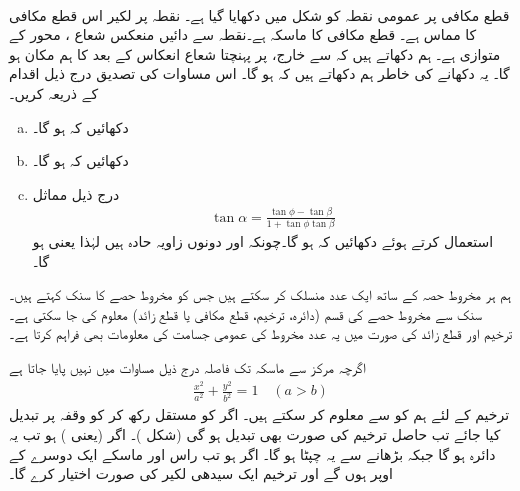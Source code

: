 \\
قطع مکافی  پر عمومی نقطہ  کو شکل  میں دکھایا گیا ہے۔ نقطہ  پر لکیر  اس قطع مکافی کا مماس ہے۔ قطع مکافی کا ماسکہ  ہے۔نقطہ  سے دائیں منعکس شعاع ، محور  کے متوازی  ہے۔ ہم دکھاتے ہیں کہ  سے خارج،  پر پہنچتا شعاع انعکاس کے بعد  کا ہم مکان ہو گا۔ یہ دکھانے کی خاطر ہم دکھاتے ہیں کہ  ہو گا۔ اس مساوات کی تصدیق درج ذیل اقدام کے ذریعہ کریں۔
\begin{enumerate}[a.]
\item
دکھائیں کہ  ہو گا۔
\item
دکھائیں کہ  ہو گا۔
\item
درج ذیل مماثل
\begin{align*}
\tan \alpha=\frac{\tan \phi-\tan\beta}{1+\tan\phi\tan\beta}
\end{align*}
استعمال کرتے ہوئے دکھائیں کہ  ہو گا۔چونکہ  اور  دونوں زاویہ حادہ ہیں لہٰذا
  یعنی  ہو گا۔ 
\end{enumerate}  

ہم ہر مخروط حصہ کے ساتھ ایک عدد منسلک کر سکتے ہیں جس کو مخروط حصے کا سنک کہتے ہیں۔ سنک سے مخروط حصے کی قسم (دائرہ، ترخیم، قطع مکافی یا قطع زائد) معلوم کی جا سکتی ہے۔ ترخیم اور قطع زائد کی صورت میں یہ عدد مخروط کی عمومی جسامت کی معلومات بھی فراہم کرتا ہے۔

اگرچہ مرکز سے ماسکہ تک فاصلہ  درج ذیل مساوات میں نہیں پایا جاتا ہے
\begin{align*}
\frac{x^2}{a^2}+\frac{y^2}{b^2}=1\quad (a>b)
\end{align*}
ترخیم کے لئے ہم  کو  سے معلوم کر سکتے ہیں۔ اگر  کو مستقل رکھ کر  کو وقفہ  پر تبدیل کیا جائے تب حاصل ترخیم کی صورت  بھی تبدیل ہو گی (شکل )۔ اگر  (یعنی ) ہو تب یہ دائرہ ہو گا جبکہ  بڑھانے سے یہ چپٹا ہو گا۔ اگر  ہو تب راس اور ماسکے ایک دوسرے کے اوپر ہوں گے اور ترخیم ایک سیدھی لکیر کی صورت اختیار کرے گا۔

